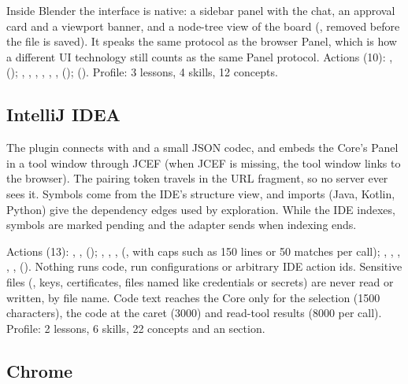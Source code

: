Inside Blender the interface is native: a sidebar panel with the chat, an approval card and a viewport banner, and a node-tree view of the board (, removed before the file is saved). It speaks the same  protocol as the browser Panel, which is how a different UI technology still counts as the same Panel protocol. Actions (10): ,  (); , , , , , ,  ();  (). Profile: 3 lessons, 4 skills, 12 concepts.

\subsection{IntelliJ IDEA}

The plugin connects with  and a small JSON codec, and embeds the Core's Panel in a tool window through JCEF (when JCEF is missing, the tool window links to the browser). The pairing token travels in the URL fragment, so no server ever sees it. Symbols come from the IDE's structure view, and imports (Java, Kotlin, Python) give the dependency edges used by exploration. While the IDE indexes, symbols are marked pending and the adapter sends  when indexing ends.

Actions (13): , ,  (); , , ,  (, with caps such as 150 lines or 50 matches per call); , , , , ,  (). Nothing runs code, run configurations or arbitrary IDE action ids. Sensitive files (, keys, certificates, files named like credentials or secrets) are never read or written, by file name. Code text reaches the Core only for the selection (1500 characters), the code at the caret (3000) and read-tool results (8000 per call). Profile: 2 lessons, 6 skills, 22 concepts and an  section.

\subsection{Chrome}

